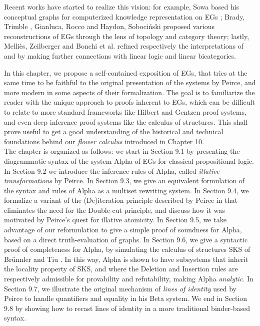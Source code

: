 \documentclass[11pt]{article}
\begin{document}
Recent works have started to realize this vision: for example, Sowa based his
conceptual graphs for computerized knowledge representation on EGs
\cite{sowa_conceptual_1976}; Brady, Trimble
\cite{brady_categorical_2000,brady_string_nodate}, Gianluca, Rocco
\cite{caterina_new_2020} and Haydon, Sobociński
\cite{pietarinen_compositional_2020} proposed various reconstructions of
EGs through the lens of topology and category theory; lastly,
Melliès, Zeilberger \cite{mellies_bifibrational_2016} and Bonchi et al.
\cite{bonchi_diagrammatic_2024} refined respectively the interpretations of
\cite{brady_string_nodate} and \cite{pietarinen_compositional_2020} by making
further connections with linear logic \cite{girard-linear-1987} and
linear bicategories.

In this chapter, we propose a self-contained exposition of EGs, that tries
at the same time to be faithful to the original presentation of the systems by
Peirce, and more modern in some aspects of their formalization. The goal is
to familiarize the reader with the unique approach to proofs inherent to
EGs, which can be difficult to relate to more standard frameworks like
Hilbert and Gentzen proof systems, and even deep inference proof systems
like the calculus of structures. This shall prove useful to get a good
understanding of the historical and technical foundations behind our
\emph{flower calculus} introduced in Chapter 10.
\\

The chapter is organized as follows: we start in Section 9.1 by presenting the diagrammatic syntax
of the system Alpha of EGs for classical propositional logic. In Section 9.2 we introduce the
inference rules of Alpha, called \emph{illative transformations} by Peirce. In Section 9.3, we give
an equivalent formulation of the syntax and rules of Alpha as a multiset rewriting system. In
Section 9.4, we formalize a variant of the (De)iteration principle described by Peirce in
\cite{peirce_prolegomena_1906} that eliminates the need for the Double-cut principle, and discuss
how it was motivated by Peirce's quest for illative atomicity. In Section 9.5, we take advantage of
our reformulation to give a simple proof of soundness for Alpha, based on a direct truth-evaluation
of graphs. In Section 9.6, we give a syntactic proof of completeness for Alpha, by simulating the
calculus of structures SKS of Brünnler and Tiu \cite{brunnler_local_2001}. In this way, Alpha is
shown to have subsystems that inherit the locality property of SKS, and where the Deletion and
Insertion rules are respectively admissible for provability and refutability, making Alpha
\emph{analytic}. In Section 9.7, we illustrate the original mechanism of \emph{lines of identity}
used by Peirce to handle quantifiers and equality in his Beta system. We end in Section 9.8 by
showing how to recast lines of identity in a more traditional binder-based syntax.
\end{document}
